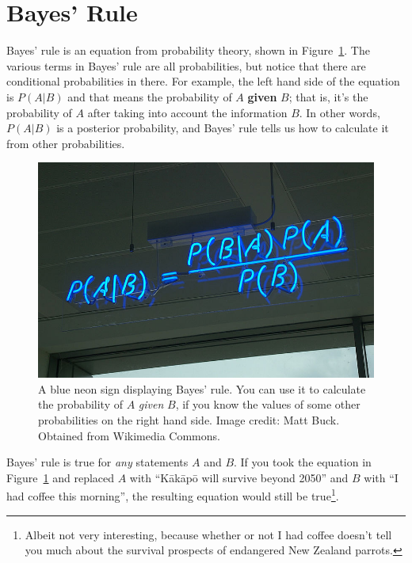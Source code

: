 \section{Bayes' Rule}
Bayes' rule is an equation from probability theory, shown in
Figure~\ref{fig:bayes_neon}. The various terms in Bayes' rule are all
probabilities, but notice that there are conditional probabilities in there.
For example, the left hand side of the equation is $P(A|B)$ and that means
the probability of $A$ {\bf given} $B$; that is, it's the probability of $A$
after taking into account the information $B$. In other words,
$P(A|B)$ is a posterior probability, and Bayes' rule tells us how to calculate
it from other probabilities.
\begin{figure}[h]
\begin{center}
\includegraphics[scale=0.4]{Figures/bayes_neon.jpg}
\caption{A blue neon sign displaying Bayes' rule.
You can use it to calculate the probability of $A$ {\it given} $B$,
if you know the values of some other probabilities on the right hand side.
Image credit: Matt Buck. Obtained from Wikimedia Commons.
\label{fig:bayes_neon}}
\end{center}
\end{figure}
Bayes' rule is true for {\it any} statements $A$ and $B$. If you took the
equation in Figure~\ref{fig:bayes_neon} and replaced $A$ with
``K\={a}k\={a}p\={o} will survive beyond 2050'' and $B$ with
``I had coffee this morning'', the
resulting equation would still be true\footnote{Albeit not very interesting,
because
whether or not I had coffee doesn't tell you much about the survival prospects
of endangered New Zealand parrots.}.

